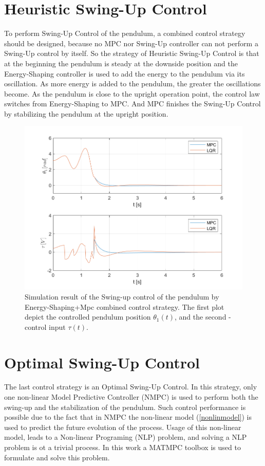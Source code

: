 \section{Heuristic Swing-Up Control}
To perform Swing-Up Control of the pendulum, a combined control strategy should be designed, because no MPC nor Swing-Up controller can not perform a Swing-Up control by itself. So the strategy of Heuristic Swing-Up Control is that at the beginning the pendulum is steady at the downside position and the Energy-Shaping controller is used to add the energy to the pendulum via its oscillation. As more energy is added to the pendulum, the greater the oscillations become. As the pendulum is close to the upright operation point, the control law switches from Energy-Shaping to MPC. And MPC finishes the Swing-Up Control by stabilizing the pendulum at the upright position.
\begin{figure}[H]
	\centering
	\includegraphics[width=1.1\linewidth]{images/MPC-LQR_Swing}
	\caption{Simulation result of the Swing-up control of the pendulum by Energy-Shaping+Mpc combined control strategy. The first plot depict the controlled pendulum position $\theta_1(t)$, and the second - control input $\tau(t)$.}
	\label{combo}
\end{figure}
\newpage
\section{Optimal Swing-Up Control}
The last control strategy is an Optimal Swing-Up Control. In this strategy, only one non-linear Model Predictive Controller (NMPC) is used to perform both the swing-up and the stabilization of the pendulum. Such control performance is possible due to the fact that in NMPC the non-linear model (\ref{nonlinmodel}) is used to predict the future evolution of the process.  Usage of this non-linear model, leads to a Non-linear Programing (NLP) problem, and solving a NLP problem is ot a trivial process. In this work a \textsc{MATMPC} toolbox is used \cite{MATMPC} to formulate and solve this problem.\\

